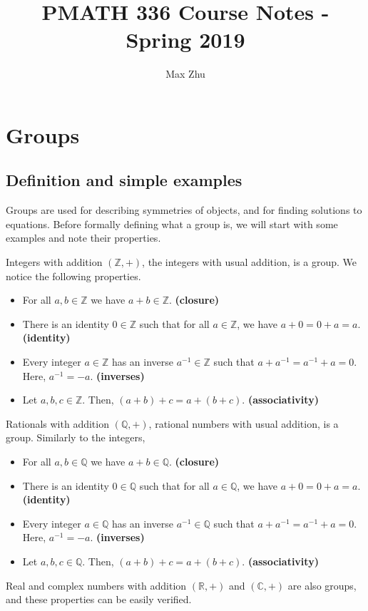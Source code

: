 \documentclass[12pt]{article}
\title{PMATH 336 Course Notes - Spring 2019}
\author{Max Zhu}
\newcommand{\R}{\mathbb{R}}
\newcommand{\Z}{\mathbb{Z}}
\newcommand{\Q}{\mathbb{Q}}
\renewcommand{\C}{\mathbb{C}}
\newcommand{\inv}{^{-1}}
\begin{document}
	\maketitle
	\tableofcontents\newpage
	
	\section{Groups}
	\subsection{Definition and simple examples}
	Groups are used for describing symmetries of objects, and for finding solutions to equations. Before formally defining what a group is, we will start with some examples and note their properties.
	\begin{myex}{Integers with addition}{}
		$(\Z, +)$, the integers with usual addition, is a group. We notice the following properties.
		\begin{itemize}
			\item For all $a, b\in\Z$ we have $a+b\in\Z$. \textbf{(closure)}
			\item There is an identity $0\in\Z$ such that for all $a\in\Z$, we have $a+0=0+a=a$. \textbf{(identity)}
			\item Every integer $a\in\Z$ has an inverse $a\inv\in\Z$ such that $a+a\inv=a\inv+a=0$. Here, $a\inv=-a$. \textbf{(inverses)}
			\item Let $a, b, c\in\Z$. Then, $(a+b)+c=a+(b+c)$. \textbf{(associativity)}
		\end{itemize}
	\end{myex}
	
	\begin{myex}{Rationals with addition}{}
		$(\Q, +)$, rational numbers with usual addition, is a group. Similarly to the integers,
		\begin{itemize}
			\item For all $a, b\in\Q$ we have $a+b\in\Q$. \textbf{(closure)}
			\item There is an identity $0\in\Q$ such that for all $a\in\Q$, we have $a+0=0+a=a$. \textbf{(identity)}
			\item Every integer $a\in\Q$ has an inverse $a\inv\in\Q$ such that $a+a\inv=a\inv+a=0$. Here, $a\inv=-a$. \textbf{(inverses)}
			\item Let $a, b, c\in\Q$. Then, $(a+b)+c=a+(b+c)$. \textbf{(associativity)}
		\end{itemize}
	\end{myex}
	\begin{myex}{Real and complex numbers with addition}{}
		$(\R, +)$ and $(\C, +)$ are also groups, and these properties can be easily verified.
	\end{myex}
	
\end{document}
